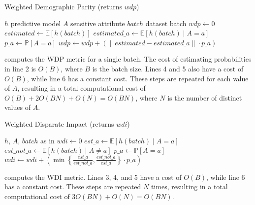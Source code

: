 \begin{algorithm}
    \caption{Weighted Demographic Parity (returns $wdp$)}
    \label{alg:wdp}
    \begin{algorithmic}[1]
        \REQUIRE $h$ \hfill predictive model
        \REQUIRE $A$ \hfill sensitive attribute
        \REQUIRE $batch$ \hfill dataset batch
        \STATE $wdp \leftarrow 0$
        \STATE $estimated \leftarrow \mathbb{E}[h(batch)]$
            \STATE $estimated\_a \leftarrow \mathbb{E}[h(batch) \mid A = a]$
            \STATE $p\_a \leftarrow \mathbb{P}[A = a]$
            \STATE $wdp \leftarrow wdp + \left( \| estimated - estimated\_a \| \cdot p\_a \right)$
        \ENDFOR
    \end{algorithmic}
\end{algorithm}

%
 computes the \gls{WDP} metric for a single batch.
%
The cost of estimating probabilities in line 2 is \(O(B)\), where \(B\) is the batch size.
%
Lines 4 and 5 also have a cost of \(O(B)\), while line 6 has a constant cost.
%
These steps are repeated for each value of \(A\), resulting in a total computational cost of \(O(B) + 2O(BN) + O(N) = O(BN)\), where \(N\) is the number of distinct values of \(A\).

\begin{algorithm}
    \caption{Weighted Disparate Impact (returns $wdi$)}
    \label{alg:wdi}
    \begin{algorithmic}[1]
        \REQUIRE $h$, $A$, $batch$ \hfill as in 
        \STATE $wdi \leftarrow 0$
            \STATE $est\_a \leftarrow \mathbb{E}[h(batch) \mid A = a]$
            \STATE $est\_not\_a \leftarrow \mathbb{E}[h(batch) \mid A \neq a]$
            \STATE $p\_a \leftarrow \mathbb{P}[A = a]$
            \STATE $wdi \leftarrow wdi + \left( \min\left\{ \frac{est\_a}{est\_not\_a}, \frac{est\_not\_a}{est\_a} \right\} \cdot p\_a \right)$
        \ENDFOR
    \end{algorithmic}
\end{algorithm}

%
 computes the \gls{WDI} metric.
%
Lines 3, 4, and 5 have a cost of \(O(B)\), while line 6 has a constant cost.
%
These steps are repeated \(N\) times, resulting in a total computational cost of \(3O(BN) + O(N) = O(BN)\).

